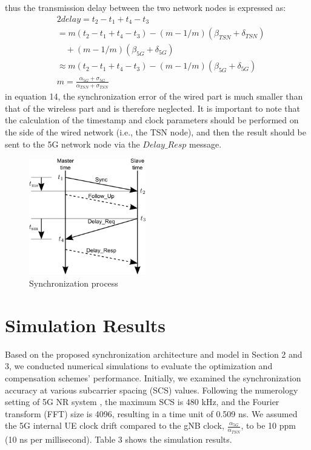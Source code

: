 \documentclass[english]{cccconf}
\begin{document}
thus the transmission delay between the two network nodes is expressed as:
\begin{equation}
	\begin{split}
		&2  delay =t_{2}-t_{1}+t_{4}-t_{3} \\
		&=m\left(t_{2}-t_{1}+t_{4}-t_{3}\right)-(m-1 / m)\left(\beta_{TSN}+\delta_{TSN}\right)\\
		&\quad+(m-1 / m)\left(\beta_{5G}+\delta_{5G}\right)\\
		& \approx m\left(t_{2}-t_{1}+t_{4}-t_{3}\right)-(m-1 / m)\left(\beta_{5G}+\delta_{5G}\right)\\
		&m=\frac{\alpha_{5G}+\sigma_{5G}}{\alpha_{TSN}+\sigma_{TSN}}		
	\end{split}
\end{equation}
in equation 14, the synchronization error of the wired part is much smaller than that of the wireless part and is therefore neglected. It is important to note that the calculation of the timestamp and clock parameters should be performed on the side of the wired network (i.e., the TSN node), and then the result should be sent to the 5G network node via the $Delay\_Resp$ message.

\begin{figure}[htbp]
	\centering
	\setcounter{figure}{5}
	\includegraphics[width=2in]{fig10.png}
	\caption{Synchronization process}
\end{figure}
\section{Simulation Results}
Based on the proposed synchronization architecture and model in Section 2 and 3, we conducted numerical simulations to evaluate the optimization and compensation schemes' performance. Initially, we examined the synchronization accuracy at various subcarrier spacing (SCS) values. Following the numerology setting of 5G NR system \cite{access2015requirements}, the maximum SCS is 480 kHz, and the Fourier transform (FFT) size is 4096, resulting in a time unit of 0.509 ns. We assumed the 5G internal UE clock drift compared to the gNB clock, $\frac{\alpha_{5G}}{\alpha_{TSN}}$, to be 10 ppm (10 ns per millisecond). Table 3 shows the simulation results.
\end{document}
